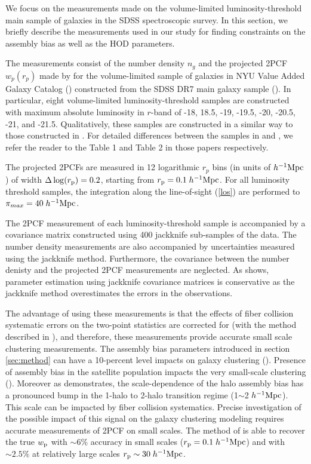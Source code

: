\documentclass[twocolumn]{aastex61}
\newcommand{\wpp}{w_{\rm p}}
\begin{document}
We focus on the measurements made on the volume-limited luminosity-threshold main sample of galaxies in the SDSS spectroscopic survey. In this section, we briefly describe the measurements used in our study for finding constraints on the assembly bias as well as the HOD parameters.

The measurements consist of the number density $n_{g}$ and the projected 2PCF $w_{p}(r_{p})$ made by \citet{guo2015} for the volume-limited sample of galaxies in NYU Value Added Galaxy Catalog (\citealt{Blanton2005}) constructed from the SDSS DR7 main galaxy sample (\citealt{abazajian2009}). In particular, eight volume-limited luminosity-threshold samples are constructed with maximum absolute luminosity in $r$-band of -18, 18.5, -19, -19.5, -20, -20.5, -21, and -21.5. Qualitatively, these samples are constructed in a similar way to those constructed in \citet{zehavi2011}. For detailed differences between the samples in \citet{guo2015} and \citet{zehavi2011}, we refer the reader to the Table 1 and Table 2 in those papers respectively. 


The projected 2PCFs are measured in 12 logarithmic $r_{p}$ bins (in units of $h^{-1}\rm{Mpc}$) of width $\Delta \log(r_{\rm p}) = 0.2$, starting from $r_{\rm{p}} = 0.1 \; h^{-1}\rm{Mpc}$. For all luminosity threshold samples, the integration along the line-of-sight (\ref{los}) are performed to $\pi_{max}=40 \; h^{-1}\rm{Mpc}$. 

The 2PCF measurement of each luminosity-threshold sample is accompanied by a covariance matrix constructed using 400 jackknife sub-samples of the data. The number density measurements are also accompanied by uncertainties measured using the jackknife method. Furthermore, the covariance between the number denisty and the projected 2PCF measurements are neglected. As \citet{norberg} shows, parameter estimation using jackknife covariance matrices is conservative as the jackknife method overestimates the errors in the observations. 

The advantage of using these measurements is that the effects of fiber collision systematic errors on the two-point statistics are corrected for (with the method described in \citealt{guo2012}), and therefore, these measurements provide accurate small scale clustering measurements. The assembly bias parameters introduced in section \ref{sec:method} can have a 10-percent level impacts on galaxy clustering (\citealt{decorated}). Presence of assembly bias in the satellite population impacts the very small-scale clustering (\citealt{decorated}). Moreover as \citet{sunayama2016} demonstrates, the scale-dependence of the halo assembly bias has a pronounced bump in the 1-halo to 2-halo transition regime (1$\sim$2 $h^{-1}\rm{Mpc}$). This scale can be impacted by fiber collision systematics. Precise investigation of the possible impact of this signal on the galaxy clustering modeling requires accurate measurements of 2PCF on small scales. 
The method of \citet{guo2012} is able to recover the true $\wpp$ with  $\sim 6\%$ accuracy in small scales ($r_{\rm{p}} = 0.1 \; h^{-1}\rm{Mpc}$) and with $\sim 2.5\%$ at relatively large scales $r_{\rm{p}} \sim 30 \; h^{-1}\rm{Mpc}$. 
\end{document}
